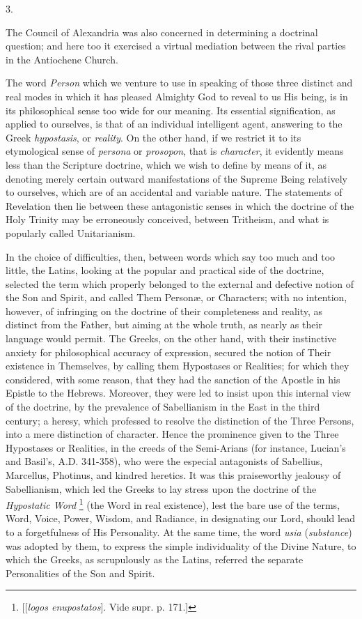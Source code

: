 3.

The Council of Alexandria was also concerned in determining a
doctrinal question; and here too it exercised a virtual mediation
between the rival parties in the Antiochene Church.

The word \emph{Person} which we venture to use in speaking of those
three distinct and real modes in which it has pleased Almighty God to
reveal to us His being, is in its philosophical sense too wide for our
meaning. Its essential signification, as applied to ourselves, is that
of an individual intelligent agent, answering to the Greek \emph{hypostasis},
or \emph{reality}. On the other hand, if we restrict it to its
etymological sense of \emph{persona} or \emph{prosopon}, that is \emph{character},
it evidently means less than the Scripture doctrine, which we wish to
define by means of it, as denoting merely certain outward
manifestations of the Supreme Being relatively to ourselves, which are
of an accidental and variable nature. The statements of Revelation
then lie between these antagonistic senses in which the doctrine of
the Holy Trinity may be erroneously conceived, between Tritheism, and
what is popularly called Unitarianism.

In the choice of difficulties, then, between words which say too
much and too little, the Latins, looking at the popular and practical
side of the doctrine, selected the term which properly belonged to the
external and defective notion of the Son and Spirit, and called Them
Personæ, or Characters; with no intention, however, of infringing on
the doctrine of their completeness and reality, as distinct from the
Father, but aiming at the whole truth, as nearly as their language
would permit. The Greeks, on the other hand, with their instinctive
anxiety for philosophical accuracy of expression, secured the notion
of Their existence in Themselves, by calling them Hypostases or
Realities; for which they considered, with some reason, that they had
the sanction of the Apostle in his Epistle to the Hebrews. Moreover,
they were led to insist upon this internal view of the doctrine, by
the prevalence of Sabellianism in the East in the third century; a
heresy, which professed to resolve the distinction of the Three
Persons, into a mere distinction of character. Hence the prominence
given to the Three Hypostases or Realities, in the creeds of the
Semi-Arians (for instance, Lucian's and Basil's, A.D.
341-358), who were the especial antagonists of Sabellius, Marcellus,
Photinus, and kindred heretics. It was this praiseworthy jealousy of
Sabellianism, which led the Greeks to lay stress upon the
doctrine of the \emph{Hypostatic Word} \footnote{[[\emph{logos enupostatos}]. Vide supr. p.
171.]} (the Word in real existence), lest the bare use of the terms,
Word, Voice, Power, Wisdom, and Radiance, in designating our Lord,
should lead to a forgetfulness of His Personality. At the same time,
the word \emph{usia} (\emph{substance}) was adopted by them, to
express the simple individuality of the Divine Nature, to which the
Greeks, as scrupulously as the Latins, referred the separate
Personalities of the Son and Spirit.

